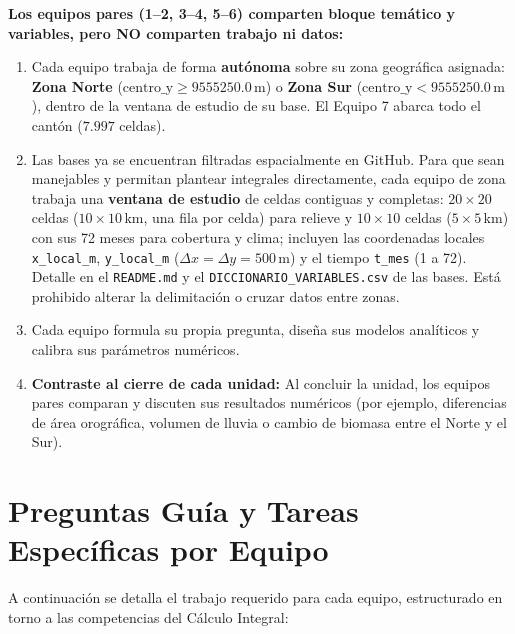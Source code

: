 \documentclass[11pt,a4paper]{article}
\begin{document}
\clearpage
\begin{alertbox}[title=Regla Territorial Fundamental para Temas Compartidos]
\textbf{Los equipos pares (1--2, 3--4, 5--6) comparten bloque temático y variables, pero NO comparten trabajo ni datos:}
\begin{enumerate}[leftmargin=*,itemsep=1pt]
  \item Cada equipo trabaja de forma \textbf{autónoma} sobre su zona geográfica asignada:
  \textbf{Zona Norte} ($\text{centro\_y} \ge 9555250.0\,\text{m}$) o \textbf{Zona Sur} ($\text{centro\_y} < 9555250.0\,\text{m}$), dentro de la ventana de estudio de su base. El Equipo 7 abarca todo el cantón ($7.997$ celdas).
  \item Las bases ya se encuentran filtradas espacialmente en GitHub. Para que sean manejables y permitan plantear integrales directamente, cada equipo de zona trabaja una \textbf{ventana de estudio} de celdas contiguas y completas: $20\times20$ celdas ($10\times10$\,km, una fila por celda) para relieve y $10\times10$ celdas ($5\times5$\,km) con sus 72 meses para cobertura y clima; incluyen las coordenadas locales \texttt{x\_local\_m}, \texttt{y\_local\_m} ($\Delta x=\Delta y=500$\,m) y el tiempo \texttt{t\_mes} (1 a 72). Detalle en el \texttt{README.md} y el \texttt{DICCIONARIO\_\allowbreak VARIABLES.csv} de las bases. Está prohibido alterar la delimitación o cruzar datos entre zonas.
  \item Cada equipo formula su propia pregunta, diseña sus modelos analíticos y calibra sus parámetros numéricos.
  \item \textbf{Contraste al cierre de cada unidad:} Al concluir la unidad, los equipos pares comparan y discuten sus resultados numéricos (por ejemplo, diferencias de área orográfica, volumen de lluvia o cambio de biomasa entre el Norte y el Sur).
\end{enumerate}
\end{alertbox}

\section{Preguntas Guía y Tareas Específicas por Equipo}

A continuación se detalla el trabajo requerido para cada equipo, estructurado en torno a las competencias del Cálculo Integral:
\end{document}
